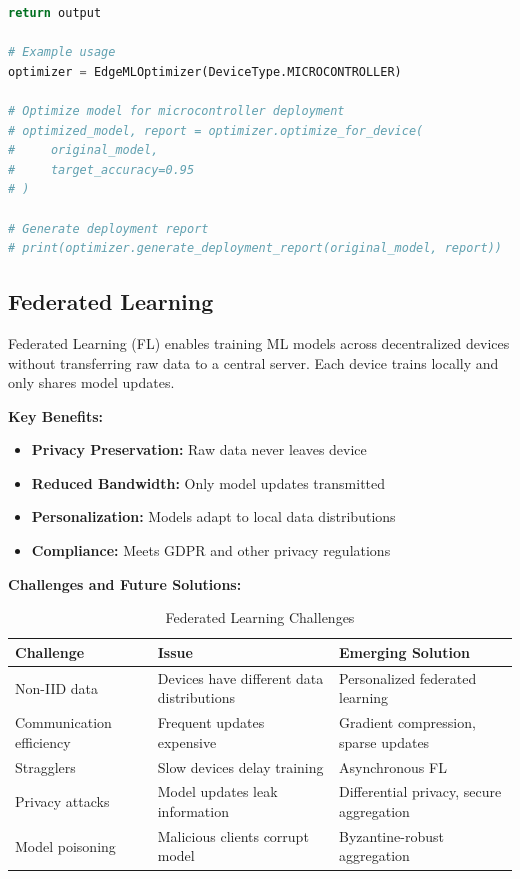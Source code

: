 \begin{lstlisting}[language=Python, caption=Edge ML Optimization Framework]
        return output

# Example usage
optimizer = EdgeMLOptimizer(DeviceType.MICROCONTROLLER)

# Optimize model for microcontroller deployment
# optimized_model, report = optimizer.optimize_for_device(
#     original_model,
#     target_accuracy=0.95
# )

# Generate deployment report
# print(optimizer.generate_deployment_report(original_model, report))
\end{lstlisting}

\subsection{Federated Learning}

Federated Learning (FL) enables training ML models across decentralized devices without transferring raw data to a central server. Each device trains locally and only shares model updates.

\textbf{Key Benefits:}
\begin{itemize}
    \item \textbf{Privacy Preservation:} Raw data never leaves device
    \item \textbf{Reduced Bandwidth:} Only model updates transmitted
    \item \textbf{Personalization:} Models adapt to local data distributions
    \item \textbf{Compliance:} Meets GDPR and other privacy regulations
\end{itemize}

\textbf{Challenges and Future Solutions:}

\begin{table}[h]
\centering
\caption{Federated Learning Challenges}
\begin{tabular}{p{3.5cm}p{5cm}p{4cm}}
\toprule
\textbf{Challenge} & \textbf{Issue} & \textbf{Emerging Solution} \\
\midrule
Non-IID data & Devices have different data distributions & Personalized federated learning \\
\midrule
Communication efficiency & Frequent updates expensive & Gradient compression, sparse updates \\
\midrule
Stragglers & Slow devices delay training & Asynchronous FL \\
\midrule
Privacy attacks & Model updates leak information & Differential privacy, secure aggregation \\
\midrule
Model poisoning & Malicious clients corrupt model & Byzantine-robust aggregation \\
\bottomrule
\end{tabular}
\end{table}

